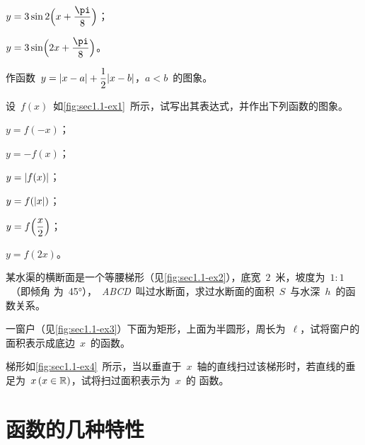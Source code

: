 \begin{exercise}
\begin{exlistcols}[3]
  \item $y=3\sin2\Paren[\Big]{x+\dfrac\pi8}$；
  \item $y=3\sin\Paren[\Big]{2x+\dfrac\pi8}$。
\end{exlistcols}
\item 作函数~$y=\abs{x-a}+\dfrac12\abs{x-b}$，$a<b$~的图象。
\item 设~$f(x)$~如\ref{fig:sec1.1-ex1}~所示，试写出其表达式，并作出下列函数的图象。
\begin{exlistcols}[3]
  \item $y=f(-x)$；
  \item $y=-f(x)$；
  \item $y=\abs{f(x)}$；
  \item $y=f(\abs x)$；
  \item $y=f\Paren[\Big]{\dfrac x2}$；
  \item $y=f(2x)$。
\end{exlistcols}
\item 某水渠的横断面是一个等腰梯形（见\ref{fig:sec1.1-ex2}），底宽~$2$~米，坡度为~$1:1$~（即倾角
为~\ang{45}），~\textit{ABCD}~叫过水断面，求过水断面的面积~$S$~与水深~$h$~的函数关系。
\begin{figure}
\begin{floatrow}[2]
\figurebox{\caption{}\label{fig:sec1.1-ex1}}
          {\somefigure}
\figurebox{\caption{}\label{fig:sec1.1-ex2}}
          {\somefigure}
\end{floatrow}
\end{figure}
\item 一窗户（见\ref{fig:sec1.1-ex3}）下面为矩形，上面为半圆形，周长为~$\ell$，试将窗户的面积表示成底边~$x$~的函数。
\begin{figure}
\begin{floatrow}[2]
\figurebox{\caption{}\label{fig:sec1.1-ex3}}
          {\somefigure}
\figurebox{\caption{}\label{fig:sec1.1-ex4}}
          {\somefigure}
\end{floatrow}
\end{figure}
\item 梯形如\ref{fig:sec1.1-ex4}~所示，当以垂直于~$x$~轴的直线扫过该梯形时，若直线的垂足为~$x\,(x\in\FR)$，试将扫过面积表示为~$x$~的
函数。
\end{exercise}



\section{函数的几种特性}

